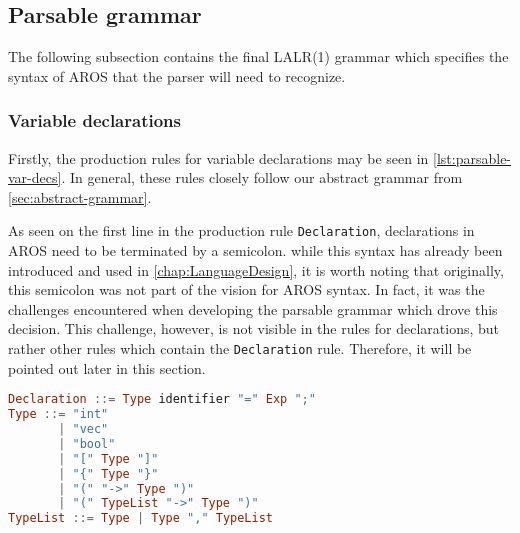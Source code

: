 \subsection{Parsable grammar}
\label{sec:parser:grammar}
The following subsection contains the final LALR(1) grammar which specifies the syntax of AROS that the parser will need to recognize. 
\subsubsection{Variable declarations}
\label{sec:parser:grammar:vardecs}
Firstly, the production rules for variable declarations may be seen in \cref{lst:parsable-var-decs}. In general, these rules closely follow our abstract grammar from \cref{sec:abstract-grammar}.
\par As seen on the first line in the production rule \lstinline{Declaration}, declarations in AROS need to be terminated by a semicolon. while this syntax has already been introduced and used in \cref{chap:LanguageDesign}, it is worth noting that originally, this semicolon was not part of the vision for AROS syntax. In fact, it was the challenges encountered when developing the parsable grammar which drove this decision. This challenge, however, is not visible in the rules for declarations, but rather other rules which contain the \lstinline{Declaration} rule. Therefore, it will be pointed out later in this section. 
\begin{lstlisting}[language=haskell, float=htb,
caption=Parsable production rules for variable declarations,
label=lst:parsable-var-decs]
Declaration ::= Type identifier "=" Exp ";"
Type ::= "int"
       | "vec"
       | "bool" 
       | "[" Type "]" 
       | "{" Type "}" 
       | "(" "->" Type ")"
       | "(" TypeList "->" Type ")"
TypeList ::= Type | Type "," TypeList
\end{lstlisting}
